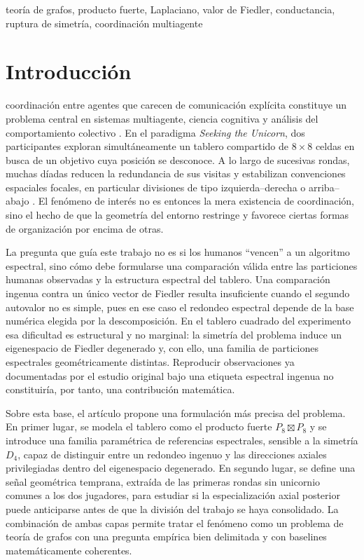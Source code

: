 \documentclass[journal]{IEEEtran}
\begin{document}
\begin{IEEEkeywords}
teoría de grafos, producto fuerte, Laplaciano, valor de Fiedler, conductancia, ruptura de simetría, coordinación multiagente
\end{IEEEkeywords}

\section{Introducción}

 coordinación entre agentes que carecen de comunicación explícita constituye un problema central en sistemas multiagente, ciencia cognitiva y análisis del comportamiento colectivo \cite{mesbahi2010,andrade2021,goldstone2024}. En el paradigma \emph{Seeking the Unicorn}, dos participantes exploran simultáneamente un tablero compartido de $8\times 8$ celdas en busca de un objetivo cuya posición se desconoce. A lo largo de sucesivas rondas, muchas díadas reducen la redundancia de sus visitas y estabilizan convenciones espaciales focales, en particular divisiones de tipo izquierda--derecha o arriba--abajo \cite{andrade2021}. El fenómeno de interés no es entonces la mera existencia de coordinación, sino el hecho de que la geometría del entorno restringe y favorece ciertas formas de organización por encima de otras.

La pregunta que guía este trabajo no es si los humanos ``vencen'' a un algoritmo espectral, sino cómo debe formularse una comparación válida entre las particiones humanas observadas y la estructura espectral del tablero. Una comparación ingenua contra un único vector de Fiedler resulta insuficiente cuando el segundo autovalor no es simple, pues en ese caso el redondeo espectral depende de la base numérica elegida por la descomposición. En el tablero cuadrado del experimento esa dificultad es estructural y no marginal: la simetría del problema induce un eigenespacio de Fiedler degenerado y, con ello, una familia de particiones espectrales geométricamente distintas. Reproducir observaciones ya documentadas por el estudio original \cite{andrade2021} bajo una etiqueta espectral ingenua no constituiría, por tanto, una contribución matemática.

Sobre esta base, el artículo propone una formulación más precisa del problema. En primer lugar, se modela el tablero como el producto fuerte $P_8 \boxtimes P_8$ y se introduce una familia paramétrica de referencias espectrales, sensible a la simetría $D_4$, capaz de distinguir entre un redondeo ingenuo y las direcciones axiales privilegiadas dentro del eigenespacio degenerado. En segundo lugar, se define una señal geométrica temprana, extraída de las primeras rondas sin unicornio comunes a los dos jugadores, para estudiar si la especialización axial posterior puede anticiparse antes de que la división del trabajo se haya consolidado. La combinación de ambas capas permite tratar el fenómeno como un problema de teoría de grafos con una pregunta empírica bien delimitada y con baselines matemáticamente coherentes.
\end{document}
